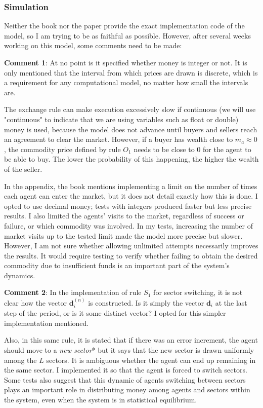 \subsubsection{Simulation} 

Neither the book nor the paper provide the exact implementation code of the model, so I am trying to be as faithful as possible.  However, after several weeks working on this model, some comments need to be made:

\textbf{Comment 1}: At no point is it specified whether money is integer or not.  It is only mentioned that the interval from which prices are drawn is discrete,  which is a requirement for any computational model, no matter how small the intervals are.  

The exchange rule can make execution excessively slow if continuous (we will use "continuous" to indicate that we are using variables such as float or double)  money is used,  because the model does not advance until buyers and sellers reach an agreement to clear the market.  However, if a buyer has wealth close to $m_a \approx 0$, the commodity price defined by rule $O_1$  needs to be close to $0$ for the agent to be able to buy.  The lower the probability of this happening, the higher the wealth of the seller.  

In the appendix, the book mentions implementing a limit on the number of times each agent can enter the market,  but it does not detail exactly how this is done.  I opted to use decimal money; tests with integers produced faster but less precise results.  I also limited the agents' visits to the market, regardless of success or failure, or which commodity was involved. In my tests, increasing the number of market visits up to the tested limit made the model more precise but slower.  However, I am not sure whether allowing unlimited attempts necessarily improves the results.  It would require testing to verify whether failing to obtain the desired commodity due to insufficient funds is an important part of the system's dynamics.


\textbf{Comment 2}: In the implementation of rule $S_1$ for sector switching, it is not clear how the vector $\boldsymbol{d}_{i}^{(n)}$ is constructed. Is it simply the vector $\boldsymbol{d}_{i}$ at the last step of the period, or is it some distinct vector? I opted for this simpler implementation mentioned.

Also, in this same rule, it is stated that if there was an error increment, the agent should move to a \textit{new sector}* but it says that the new sector is drawn uniformly among the $L$ sectors. It is ambiguous whether the agent can end up remaining in the same sector. I implemented it so that the agent is forced to switch sectors. Some tests also suggest that this dynamic of agents switching between sectors plays an important role in distributing money among agents and sectors within the system, even when the system is in statistical equilibrium.

